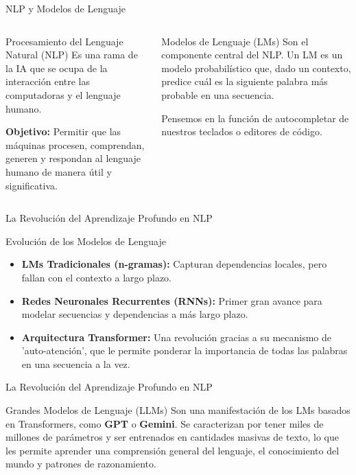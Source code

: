 \documentclass[aspectratio=169,xcolor=dvipsnames]{beamer}
\begin{document}
\begin{frame}{NLP y Modelos de Lenguaje}
    \begin{columns}[t]
            \begin{block}{Procesamiento del Lenguaje Natural (NLP)}
                Es una rama de la IA que se ocupa de la interacción entre las computadoras y el lenguaje humano.
                
                \vspace{1em}
                \textbf{Objetivo:} Permitir que las máquinas procesen, comprendan, generen y respondan al lenguaje humano de manera útil y significativa.
            \end{block}

            \begin{alertblock}{Modelos de Lenguaje (LMs)}
                 Son el componente central del NLP. Un LM es un modelo probabilístico que, dado un contexto, predice cuál es la siguiente palabra más probable en una secuencia.
                 
                 \vspace{1em}
                 Pensemos en la función de autocompletar de nuestros teclados o editores de código.
            \end{alertblock}
    \end{columns}
\end{frame}


\begin{frame}{La Revolución del Aprendizaje Profundo en NLP}
    \begin{block}{Evolución de los Modelos de Lenguaje}
        \begin{itemize}
            \item \textbf{LMs Tradicionales (n-gramas):} Capturan dependencias locales, pero fallan con el contexto a largo plazo. \pause
            \item \textbf{Redes Neuronales Recurrentes (RNNs):} Primer gran avance para modelar secuencias y dependencias a más largo plazo. \pause
            \item \textbf{Arquitectura Transformer:} Una revolución gracias a su mecanismo de 'auto-atención', que le permite ponderar la importancia de todas las palabras en una secuencia a la vez.
        \end{itemize}
    \end{block}
\end{frame}
\begin{frame}{La Revolución del Aprendizaje Profundo en NLP}

    \begin{alertblock}{Grandes Modelos de Lenguaje (LLMs)}
    Son una manifestación de los LMs basados en Transformers, como \textbf{GPT} o \textbf{Gemini}. Se caracterizan por tener miles de millones de parámetros y ser entrenados en cantidades masivas de texto, lo que les permite aprender una comprensión general del lenguaje, el conocimiento del mundo y patrones de razonamiento.
    \end{alertblock}
\end{frame}
\end{document}
